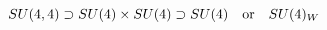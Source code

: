 \begin{equation}
SU(4,4) \supset SU(4) \times SU(4) \supset SU(4) ~~~{\rm or}~~~SU(4)_{W}
\end{equation}

